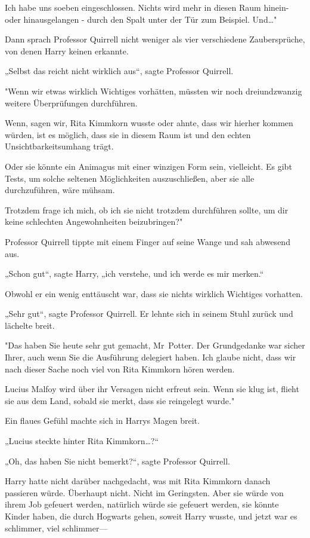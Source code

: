 {Ich habe uns soeben eingeschlossen. Nichts wird mehr in diesen Raum hinein- oder hinausgelangen - durch den Spalt unter der Tür zum Beispiel. Und…"

Dann sprach Professor Quirrell nicht weniger als vier verschiedene Zaubersprüche, von denen Harry keinen erkannte.

„Selbst das reicht nicht wirklich aus“, sagte Professor Quirrell.

"Wenn wir etwas wirklich Wichtiges vorhätten, müssten wir noch dreiundzwanzig weitere Überprüfungen durchführen.

Wenn, sagen wir, Rita Kimmkorn wusste oder ahnte, dass wir hierher kommen würden, ist es möglich, dass sie in diesem Raum ist und den echten Unsichtbarkeitsumhang trägt.

Oder sie könnte ein Animagus mit einer winzigen Form sein, vielleicht. Es gibt Tests, um solche seltenen Möglichkeiten auszuschließen, aber sie alle durchzuführen, wäre mühsam.

Trotzdem frage ich mich, ob ich sie nicht trotzdem durchführen sollte, um dir keine schlechten Angewohnheiten beizubringen?"

Professor Quirrell tippte mit einem Finger auf seine Wange und sah abwesend aus.

„Schon gut“, sagte Harry, „ich verstehe, und ich werde es mir merken.“

Obwohl er ein wenig enttäuscht war, dass sie nichts wirklich Wichtiges vorhatten.

„Sehr gut“, sagte Professor Quirrell. Er lehnte sich in seinem Stuhl zurück und lächelte breit.

"Das haben Sie heute sehr gut gemacht, Mr~Potter. Der Grundgedanke war sicher Ihrer, auch wenn Sie die Ausführung delegiert haben. Ich glaube nicht, dass wir nach dieser Sache noch viel von Rita Kimmkorn hören werden.

Lucius Malfoy wird über ihr Versagen nicht erfreut sein. Wenn sie klug ist, flieht sie aus dem Land, sobald sie merkt, dass sie reingelegt wurde."

Ein flaues Gefühl machte sich in Harrys Magen breit.

„Lucius steckte hinter Rita Kimmkorn…?“

„Oh, das haben Sie nicht bemerkt?“, sagte Professor Quirrell.

Harry hatte nicht darüber nachgedacht, was mit Rita Kimmkorn danach passieren würde. Überhaupt nicht. Nicht im Geringsten. Aber sie würde von ihrem Job gefeuert werden, natürlich würde sie gefeuert werden, sie könnte Kinder haben, die durch Hogwarts gehen, soweit Harry wusste, und jetzt war es schlimmer, viel schlimmer—

}

